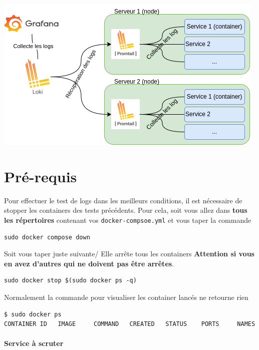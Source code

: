 \documentclass[french, 12pt]{article}%
\begin{document}
\begin{center}
\includegraphics[scale=0.7]{./ressource/loki_Protmail.png}
\end{center}


\section{Pré-requis}
Pour effectuer le test de logs dans les meilleurs conditions, il est nécessaire de stopper les containers des tests précédents. Pour cela, soit vous allez dans \textbf{tous les répertoires} contenant vos \verb?docker-compsoe.yml? et vous taper la commande 
\begin{lstlisting}[style=commande]
sudo docker compose down
\end{lstlisting}

Soit vous taper juste suivante/ Elle arrête tous les containers \textbf{Attention si vous en avez d'autres qui ne doivent pas être arrêtes}.
\begin{lstlisting}[style=commande]
sudo docker stop $(sudo docker ps -q)
\end{lstlisting}

Normalement la commande pour visualiser les container lancés ne retourne rien

\begin{lstlisting}[style=commande]
$ sudo docker ps
CONTAINER ID   IMAGE     COMMAND   CREATED   STATUS    PORTS     NAMES
\end{lstlisting}


\paragraph{Service à scruter} \
\end{document}
